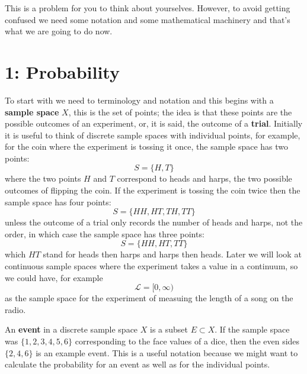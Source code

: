 \documentclass[11pt,a4paper]{scrartcl}
\begin{document}
This is a problem for you to think about yourselves. However, to avoid
getting confused we need some notation and some mathematical machinery
and that's what we are going to do now.

\section*{1: Probability}

To start with we need to terminology and notation and this begins with
a \textbf{sample space} $X$, this is the set of points; the idea is
that these points are the possible outcomes of an experiment, or, it
is said, the outcome of a \textbf{trial}. Initially it is useful to
think of discrete sample spaces with individual points, for example,
for the coin where the experiment is tossing it once, the sample space
has two points:
\begin{equation}
S=\{H,T\}
\end{equation}
where the two points $H$ and $T$ correspond to heads and harps, the
two possible outcomes of flipping the coin. If the experiment is
tossing the coin twice then the sample space has four points:
\begin{equation}
S=\{HH,HT,TH,TT\}
\end{equation}
unless the outcome of a trial only records the number of heads and
harps, not the order, in which case the sample space has three points:
\begin{equation}
S=\{HH,HT,TT\}
\end{equation}
which $HT$ stand for heads then harps and harps then heads. Later we
will look at continuous sample spaces where the experiment takes a
value in a continuum, so we could have, for example
\begin{equation}
\mathcal{L}=[0,\infty)
\end{equation}
as the sample space for the experiment of measuing the length of a
song on the radio.

An \textbf{event} in a discrete sample space $X$ is a subset
$E\subset X$. If the sample space was $\{1,2,3,4,5,6\}$
corresponding to the face values of a dice, then the even sides
$\{2,4,6\}$ is an example event. This is a useful notation because we
might want to calculate the probability for an event as well as for
the individual points.
\end{document}
